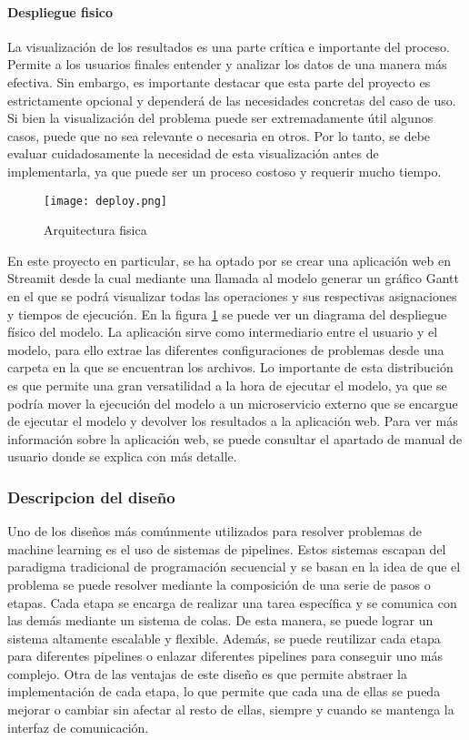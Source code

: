 \paragraph{Despliegue fisico}
La visualización de los resultados es una parte crítica e importante del proceso. Permite 
a los usuarios finales entender y analizar los datos de una manera más efectiva.  
Sin embargo, es importante destacar que esta parte del proyecto es 
estrictamente opcional y dependerá de las necesidades concretas del caso de uso. 
Si bien la visualización del problema puede ser extremadamente útil algunos casos, puede que no sea 
relevante o necesaria en otros. Por lo tanto, se debe evaluar cuidadosamente la necesidad de 
esta visualización antes de implementarla, ya que puede ser un proceso costoso y 
requerir mucho tiempo.\medskip

\begin{figure}[ht]
    \centering
    \texttt{[image: deploy.png]}
    \caption{Arquitectura fisica}
    \label{fig:despliegue}
\end{figure}

En este proyecto en particular, se ha optado por se crear una aplicación web en Streamit 
desde la cual mediante una llamada al modelo generar un gráfico Gantt en el que se podrá
visualizar todas las operaciones y sus respectivas asignaciones y tiempos de ejecución.
En la figura \ref{fig:despliegue} se puede ver un diagrama del despliegue físico del modelo.
La aplicación sirve como intermediario entre el usuario y el modelo, para ello extrae las
diferentes configuraciones de problemas desde una carpeta en la que se encuentran los 
archivos. Lo importante de esta distribución es que permite una gran versatilidad a la hora
de ejecutar el modelo, ya que se podría mover la ejecución del modelo a un microservicio
externo que se encargue de ejecutar el modelo y devolver los resultados a la aplicación web.
Para ver más información sobre la aplicación web, se puede consultar el apartado de manual
de usuario donde se explica con más detalle. 

\subsubsection{Descripcion del diseño}
Uno de los diseños más comúnmente utilizados para resolver problemas de machine learning
es el uso de sistemas de pipelines. Estos sistemas escapan del paradigma tradicional de
programación secuencial y se basan en la idea de que el problema se puede resolver
mediante la composición de una serie de pasos o etapas. Cada etapa se encarga de realizar
una tarea específica y se comunica con las demás mediante un sistema de colas. De esta
manera, se puede lograr un sistema altamente escalable y flexible. Además, se puede
reutilizar cada etapa para diferentes pipelines o enlazar diferentes pipelines para
conseguir uno más complejo. Otra de las ventajas de este diseño es que permite
abstraer la implementación de cada etapa, lo que permite que cada una de ellas se pueda
mejorar o cambiar sin afectar al resto de ellas, siempre y cuando se mantenga la
interfaz de comunicación.

